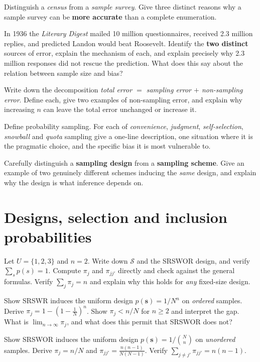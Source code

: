 Distinguish a \emph{census} from a \emph{sample survey}. Give three distinct reasons why a sample
survey can be \textbf{more accurate} than a complete enumeration.

In 1936 the \emph{Literary Digest} mailed 10 million questionnaires, received 2.3 million
replies, and predicted Landon would beat Roosevelt. Identify the \textbf{two distinct} sources of
error, explain the mechanism of each, and explain precisely why 2.3 million responses did not
rescue the prediction. What does this say about the relation between sample size and bias?

Write down the decomposition \emph{total error $=$ sampling error $+$ non-sampling error}. Define
each, give two examples of non-sampling error, and explain why increasing $n$ can leave the total
error unchanged or increase it.

Define probability sampling. For each of \emph{convenience}, \emph{judgment}, \emph{self-selection},
\emph{snowball} and \emph{quota} sampling give a one-line description, one situation where it is
the pragmatic choice, and the specific bias it is most vulnerable to.

Carefully distinguish a \textbf{sampling design} from a \textbf{sampling scheme}. Give an example
of two genuinely different schemes inducing the \emph{same} design, and explain why the design is
what inference depends on.

\section{Designs, selection and inclusion probabilities}

Let $U=\{1,2,3\}$ and $n=2$.
 Write down $\mathcal S$ and the SRSWOR design, and verify $\sum_sp(s)=1$.
 Compute $\pi_j$ and $\pi_{jj'}$ directly and check against the general formulas.
 Verify $\sum_j\pi_j=n$ and explain why this holds for \emph{any} fixed-size design.

 Show SRSWR induces the uniform design $p(\bm s)=1/N^n$ on \emph{ordered} samples.
 Derive $\pi_j=1-\left(1-\frac1N\right)^n$.
 Show $\pi_j<n/N$ for $n\ge2$ and interpret the gap.
 What is $\lim_{n\to\infty}\pi_j$, and what does this permit that SRSWOR does not?

 Show SRSWOR induces the uniform design $p(\bm s)=1/\binom Nn$ on \emph{unordered} samples.
 Derive $\pi_j=n/N$ and $\pi_{jj'}=\frac{n(n-1)}{N(N-1)}$.
 Verify $\sum_{j\ne j'}\pi_{jj'}=n(n-1)$.

